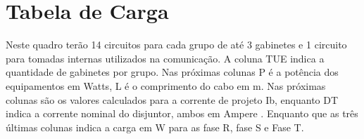 \section{Tabela de Carga}
%
%
%

Neste quadro terão 14 circuitos para cada grupo de até 3 gabinetes e 1 circuito para tomadas internas utilizados na comunicação. A coluna TUE  indica a quantidade de gabinetes por grupo. Nas próximas colunas P é a potência dos equipamentos em Watts, L é o comprimento do cabo em m. Nas próximas colunas são os valores calculados para a corrente de projeto Ib, enquanto DT indica a corrente nominal do disjuntor, ambos em Ampere . Enquanto que as três últimas colunas indica a carga em  W para as fase R, fase S e Fase T.

